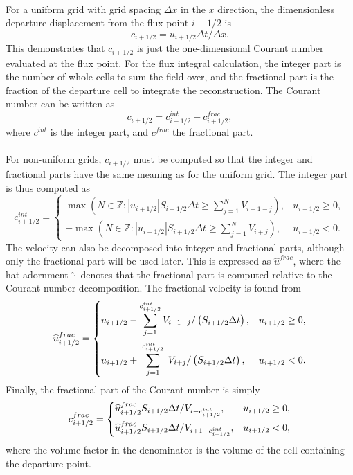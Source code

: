 \documentclass{ametsocV6.1}
\begin{document}
\\
For a uniform grid with grid spacing $\Delta x$ in the $x$ direction, the dimensionless departure displacement from the flux point $i+1/2$ is
\begin{equation}
c_{i+1/2} = u_{i+1/2} \Delta{t} / \Delta{x}.
\end{equation}
This demonstrates that $c_{i+1/2}$ is just the one-dimensional Courant number evaluated at the flux point.
For the flux integral calculation, the integer part is the number of whole cells to sum the field over, and the fractional part is the fraction of the departure cell to integrate the reconstruction. The Courant number can be written as
\begin{equation}
c_{i+1/2} = c^{int}_{i+1/2} + c^{frac}_{i+1/2},
\end{equation}
where $c^{int}$ is the integer part, and $c^{frac}$ the fractional part. \\
\\
For non-uniform grids, $c_{i+1/2}$ must be computed so that the integer and fractional parts have the same meaning as for the uniform grid.
The integer part is thus computed as
\begin{equation} \label{eqn:int_courant}
c^{int}_{i+1/2} = 
\begin{cases}
\max\left(N\in\mathbb{Z} : |u_{i+1/2}| S_{i+1/2}\Delta t \geq\sum_{j=1}^N V_{i+1-j} \right), & u_{i+1/2} \geq 0, \\
-\max\left(N\in\mathbb{Z} : |u_{i+1/2}| S_{i+1/2} \Delta t \geq\sum_{j=1}^N V_{i+j} \right), & u_{i+1/2} < 0.
\end{cases}
\end{equation}
The velocity can also be decomposed into integer and fractional parts, although only the fractional part will be used later.
This is expressed as $\widehat{u}^{frac}$, where the hat adornment $\widehat{\cdot}$ denotes that the fractional part is computed relative to the Courant number decomposition.
The fractional velocity is found from
\begin{equation} \label{eqn:frac_wind}
\widehat{u}^{frac}_{i+1/2} = 
\begin{dcases}
u_{i+1/2}-\sum_{j=1}^{c^{int}_{i+1/2}} V_{i+1-j} / \left(S_{i+1/2}\Delta t\right), & u_{i+1/2} \geq 0, \\
u_{i+1/2}+\sum_{j=1}^{\left|c^{int}_{i+1/2}\right|} V_{i+j} / \left(S_{i+1/2}\Delta t\right), & u_{i+1/2} < 0.
\end{dcases}
\end{equation}
Finally, the fractional part of the Courant number is simply
\begin{equation} \label{eqn:frac_courant}
c^{frac}_{i+1/2} =
\begin{dcases}
\widehat{u}^{frac}_{i+1/2} S_{i+1/2}\Delta t / V_{i-c^{int}_{i+1/2}}, & u_{i+1/2} \geq 0, \\
\widehat{u}^{frac}_{i+1/2} S_{i+1/2}\Delta t / V_{i+1-c^{int}_{i+1/2}}, & u_{i+1/2} < 0,
\end{dcases}
\end{equation}
where the volume factor in the denominator is the volume of the cell containing the departure point.
\end{document}
